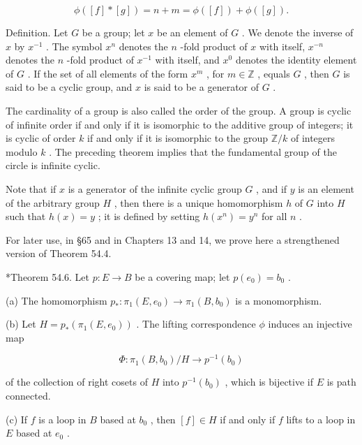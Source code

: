 \documentclass[10pt]{article}
\begin{document}
\[
\phi \left( {\left\lbrack  f\right\rbrack   * \left\lbrack  g\right\rbrack  }\right)  = n + m = \phi \left( \left\lbrack  f\right\rbrack  \right)  + \phi \left( \left\lbrack  g\right\rbrack  \right) .
\]

Definition. Let \(G\) be a group; let \(x\) be an element of \(G\) . We denote the inverse of \(x\) by \({x}^{-1}\) . The symbol \({x}^{n}\) denotes the \(n\) -fold product of \(x\) with itself, \({x}^{-n}\) denotes the \(n\) -fold product of \({x}^{-1}\) with itself, and \({x}^{0}\) denotes the identity element of \(G\) . If the set of all elements of the form \({x}^{m}\) , for \(m \in  \mathbb{Z}\) , equals \(G\) , then \(G\) is said to be a cyclic group, and \(x\) is said to be a generator of \(G\) .

The cardinality of a group is also called the order of the group. A group is cyclic of infinite order if and only if it is isomorphic to the additive group of integers; it is cyclic of order \(k\) if and only if it is isomorphic to the group \(\mathbb{Z}/k\) of integers modulo \(k\) . The preceding theorem implies that the fundamental group of the circle is infinite cyclic.

Note that if \(x\) is a generator of the infinite cyclic group \(G\) , and if \(y\) is an element of the arbitrary group \(H\) , then there is a unique homomorphism \(h\) of \(G\) into \(H\) such that \(h\left( x\right)  = y\) ; it is defined by setting \(h\left( {x}^{n}\right)  = {y}^{n}\) for all \(n\) .

For later use, in §65 and in Chapters 13 and 14, we prove here a strengthened version of Theorem 54.4.

*Theorem 54.6. Let \(p : E \rightarrow  B\) be a covering map; let \(p\left( {e}_{0}\right)  = {b}_{0}\) .

(a) The homomorphism \({p}_{ * } : {\pi }_{1}\left( {E,{e}_{0}}\right)  \rightarrow  {\pi }_{1}\left( {B,{b}_{0}}\right)\) is a monomorphism.

(b) Let \(H = {p}_{ * }\left( {{\pi }_{1}\left( {E,{e}_{0}}\right) }\right)\) . The lifting correspondence \(\phi\) induces an injective map

\[
\Phi  : {\pi }_{1}\left( {B,{b}_{0}}\right) /H \rightarrow  {p}^{-1}\left( {b}_{0}\right)
\]

of the collection of right cosets of \(H\) into \({p}^{-1}\left( {b}_{0}\right)\) , which is bijective if \(E\) is path connected.

(c) If \(f\) is a loop in \(B\) based at \({b}_{0}\) , then \(\left\lbrack  f\right\rbrack   \in  H\) if and only if \(f\) lifts to a loop in \(E\) based at \({e}_{0}\) .
\end{document}
